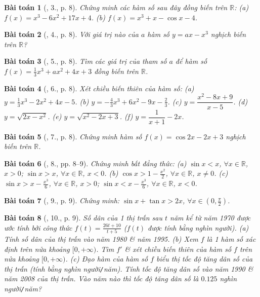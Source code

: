 \documentclass{article}
\newtheorem{baitoan}{Bài toán}
\begin{document}
\begin{baitoan}[\cite{SGK_Toan_12_giai_tich_nang_cao}, 3., p. 8]
	Chứng minh các hàm số sau đây đồng biến trên $\mathbb{R}$: (a) $f(x) = x^3 - 6x^2 + 17x + 4$. (b) $f(x) = x^3 + x - \cos x - 4$.
\end{baitoan}

\begin{baitoan}[\cite{SGK_Toan_12_giai_tich_nang_cao}, 4., p. 8]
	Với giá trị nào của $a$ hàm số $y = ax - x^3$ nghịch biến trên $\mathbb{R}$?
\end{baitoan}

\begin{baitoan}[\cite{SGK_Toan_12_giai_tich_nang_cao}, 5., p. 8]
	Tìm các giá trị của tham số $a$ để hàm số $f(x) = \frac{1}{3}x^3 + ax^2 + 4x + 3$ đồng biến trên $\mathbb{R}$.
\end{baitoan}

\begin{baitoan}[\cite{SGK_Toan_12_giai_tich_nang_cao}, 6., p. 8]
	Xét chiều biến thiên của hàm số: (a) $y = \frac{1}{3}x^3 - 2x^2 + 4x - 5$. (b) $y = -\frac{4}{3}x^3 + 6x^2 - 9x - \frac{2}{3}$. (c) $y = \dfrac{x^2 - 8x + 9}{x - 5}$. (d) $y = \sqrt{2x - x^2}$. (e) $y = \sqrt{x^2 - 2x + 3}$. (f) $y = \dfrac{1}{x + 1} - 2x$.
\end{baitoan}

\begin{baitoan}[\cite{SGK_Toan_12_giai_tich_nang_cao}, 7., p. 8]
	Chứng minh hàm số $f(x) = \cos2x - 2x + 3$ nghịch biến trên $\mathbb{R}$.
\end{baitoan}

\begin{baitoan}[\cite{SGK_Toan_12_giai_tich_nang_cao}, 8., pp. 8--9]
	Chứng minh bất đẳng thức: (a) $\sin x < x$, $\forall x\in\mathbb{R}$, $x > 0$; $\sin x > x$, $\forall x\in\mathbb{R}$, $x < 0$. (b) $\cos x > 1 - \frac{x^2}{2}$, $\forall x\in\mathbb{R}$, $x\ne0$. (c) $\sin x > x - \frac{x^3}{6}$, $\forall x\in\mathbb{R}$, $x > 0$; $\sin x < x - \frac{x^3}{6}$, $\forall x\in\mathbb{R}$, $x < 0$.
\end{baitoan}

\begin{baitoan}[\cite{SGK_Toan_12_giai_tich_nang_cao}, 9., p. 9]
	Chứng minh: $\sin x + \tan x > 2x$, $\forall x\in\left(0,\frac{\pi}{2}\right)$.
\end{baitoan}

\begin{baitoan}[\cite{SGK_Toan_12_giai_tich_nang_cao}, 10., p. 9]
	Số dân của 1 thị trấn sau $t$ năm kể từ năm 1970 được ước tính bởi công thức $f(t) = \frac{26t + 10}{t + 5}$ ($f(t)$ được tính bằng nghìn người). (a) Tính số dân của thị trấn vào năm 1980 \& năm 1995. (b) Xem $f$ là 1 hàm số xác định trên nửa khoảng $[0,+\infty)$. Tìm $f'$ \& xét chiều biến thiên của hàm số $f$ trên nửa khoảng $[0,+\infty)$. (c) Đạo hàm của hàm số $f$ biểu thị tốc độ tăng dân số của thị trấn (tính bằng nghìn người{\tt/}năm). Tính tốc độ tăng dân số vào năm 1990 \& năm 2008 của thị trấn. Vào năm nào thì tốc độ tăng dân số là $0.125$ nghìn người{\tt/}năm?
\end{baitoan}
\end{document}
